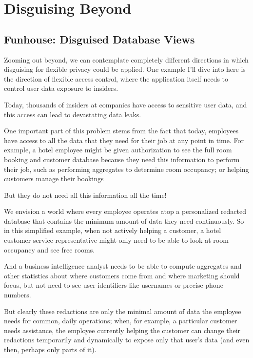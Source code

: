 
\section{Disguising Beyond \sys}


\subsection{Funhouse: Disguised Database Views}
Zooming out beyond, we can contemplate completely different directions in which
disguising for flexible privacy could be applied. One example I’ll dive into
here is the direction of flexible access control, where the application itself
needs to control user data exposure to insiders.

Today, thousands of insiders at companies have access to sensitive user data,
and this access can lead to devastating data leaks.

One important part of this problem stems from the fact that today, employees
have access to all the data that they need for their job at any point in time.
For example, a hotel employee might be given authorization to see the full room
booking and customer database because they need this information to perform
their job, such as performing aggregates to determine room occupancy; or helping
customers manage their bookings

But they do not need all this information all the time!


We envision a world where every employee operates atop a personalized redacted
database that contains the minimum amount of data they need continuously. So in
this simplified example, when not actively helping a customer, a hotel customer
service representative might only need to be able to look at room occupancy and
see free rooms.

And a business intelligence analyst needs to be able to compute aggregates and
other statistics about where customers come from and where marketing should
focus, but not need to see user identifiers like usernames or precise phone
numbers.


But clearly these redactions are only the minimal amount of data the employee
needs for common, daily operations; when, for example, a particular customer
needs assistance, the employee currently helping the customer can change their
redactions temporarily and dynamically to expose only that user’s data (and even
then, perhaps only parts of it).

